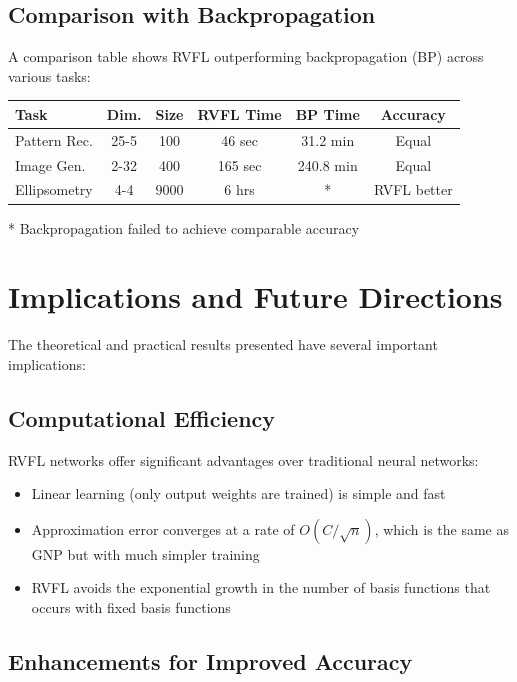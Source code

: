 \documentclass[11pt]{article}
\begin{document}
\subsection{Comparison with Backpropagation}

A comparison table shows RVFL outperforming backpropagation (BP) across various tasks:

\begin{center}
\begin{tabular}{lccccc}
\toprule
\textbf{Task} & \textbf{Dim.} & \textbf{Size} & \textbf{RVFL Time} & \textbf{BP Time} & \textbf{Accuracy} \\
\midrule
Pattern Rec. & 25-5 & 100 & 46 sec & 31.2 min & Equal \\
Image Gen. & 2-32 & 400 & 165 sec & 240.8 min & Equal \\
Ellipsometry & 4-4 & 9000 & 6 hrs & * & RVFL better \\
\bottomrule
\end{tabular}
\end{center}
* Backpropagation failed to achieve comparable accuracy

\section{Implications and Future Directions}

The theoretical and practical results presented have several important implications:

\subsection{Computational Efficiency}

RVFL networks offer significant advantages over traditional neural networks:

\begin{itemize}
    \item Linear learning (only output weights are trained) is simple and fast
    \item Approximation error converges at a rate of $O(C/\sqrt{n})$, which is the same as GNP but with much simpler training
    \item RVFL avoids the exponential growth in the number of basis functions that occurs with fixed basis functions
\end{itemize}

\subsection{Enhancements for Improved Accuracy}
\end{document}
